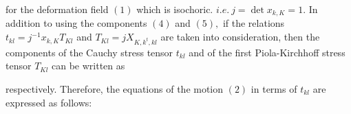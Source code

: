 \documentclass{article}
\begin{document}
\vspace{0.5cm}
\begin{Parallel}[v]{0.5\textwidth}{0.5\textwidth}
\end{Parallel}

\vspace{0.5cm}
for the deformation field $(1)$ which is isochoric. $\displaystyle i.e.\ j=\det x_{k,K}={1.}$ In addition to using the components $(4)$ and $(5),$ if the relations $t_{kl}=j^{-1}x_{k,K}T_{Kl}$ and $T_{Kl}=jX_{K,k^{t},kl}$ are taken into consideration, then the components of the Cauchy stress tensor $t_{kl}$ and of the first Piola-Kirchhoff stress tensor $T_{Kl}$ can be written as

\vspace{0.5cm}
\begin{Parallel}[v]{0.5\textwidth}{0.5\textwidth}
\end{Parallel}

\vspace{0.5cm}
\begin{Parallel}[v]{0.5\textwidth}{0.5\textwidth}
\end{Parallel}

\vspace{0.5cm}
respectively. Therefore, the equations of the motion $(2)$ in terms of $t_{kl}$ are expressed as follows:

\vspace{0.5cm}
\begin{Parallel}[v]{0.5\textwidth}{0.5\textwidth}
\end{Parallel}
\end{document}
